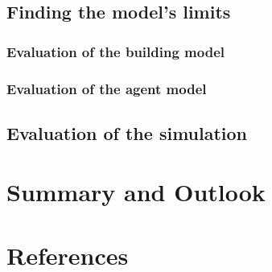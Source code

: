 \documentclass[11pt]{article}
\begin{document}
\subsection{Finding the model's limits}

\subsubsection{Evaluation of the building model}
\subsubsection{Evaluation of the agent model}

\subsection{Evaluation of the simulation}

\section{Summary and Outlook}

\section{References}
\end{document}
